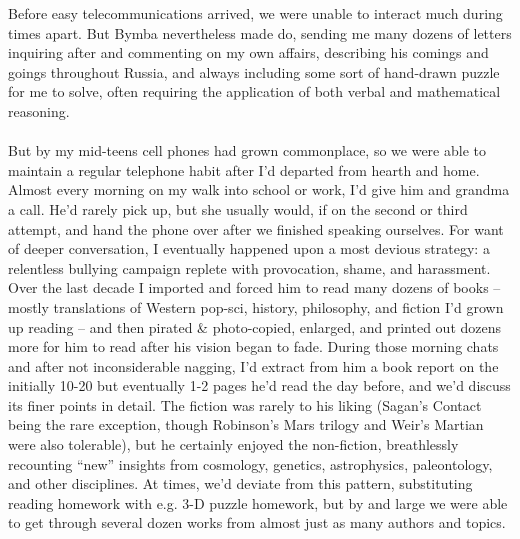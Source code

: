 \documentclass[twoside,twocolumn,openright]{article}
\begin{document}
Before easy telecommunications arrived, we were unable to interact much during times apart. But Bymba nevertheless made do, sending me many dozens of letters inquiring after and commenting on my own affairs, describing his comings and goings throughout Russia, and always including some sort of hand-drawn puzzle for me to solve, often requiring the application of both verbal and mathematical reasoning.
\\\\
But by my mid-teens cell phones had grown commonplace, so we were able to maintain a regular telephone habit after I’d departed from hearth and home. Almost every morning on my walk into school or work, I’d give him and grandma a call. He’d rarely pick up, but she usually would, if on the second or third attempt, and hand the phone over after we finished speaking ourselves. For want of deeper conversation, I eventually happened upon a most devious strategy: a relentless bullying campaign replete with provocation, shame, and harassment. Over the last decade I imported and forced him to read many dozens of books – mostly translations of Western pop-sci, history, philosophy, and fiction I'd grown up reading – and then pirated \& photo-copied, enlarged, and printed out dozens more for him to read after his vision began to fade. During those morning chats and after not inconsiderable nagging, I’d extract from him a book report on the initially 10-20 but eventually 1-2 pages he'd read the day before, and we’d discuss its finer points in detail. The fiction was rarely to his liking (Sagan’s Contact being the rare exception, though Robinson's Mars trilogy and Weir’s Martian were also tolerable), but he certainly enjoyed the non-fiction, breathlessly recounting “new” insights from cosmology, genetics, astrophysics, paleontology, and other disciplines. At times, we’d deviate from this pattern, substituting reading homework with e.g. 3-D puzzle homework, but by and large we were able to get through several dozen works from almost just as many authors and topics.
\\\\
\end{document}
